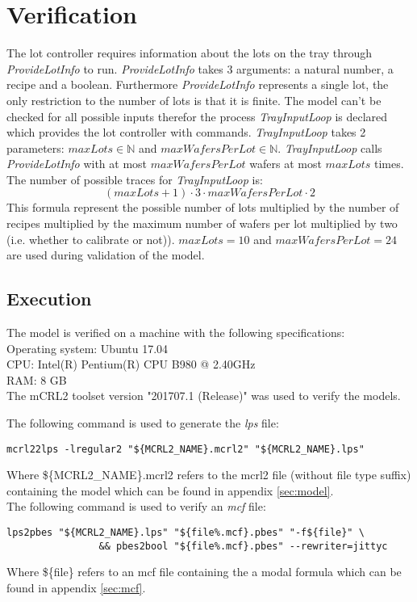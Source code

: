 \section{Verification}\label{sec:results}
The lot controller requires information about the lots on the tray through \textit{ProvideLotInfo} to run. \textit{ProvideLotInfo} takes 3 arguments: a natural number, a recipe and a boolean. Furthermore \textit{ProvideLotInfo} represents a single lot, the only restriction to the number of lots is that it is finite. The model can't be checked for all possible inputs therefor the process \textit{TrayInputLoop} is declared which provides the lot controller with  commands. \textit{TrayInputLoop} takes 2 parameters: $\mathit{maxLots} \in \mathbb{N}$ and $\mathit{maxWafersPerLot} \in \mathbb{N}$. \textit{TrayInputLoop} calls \textit{ProvideLotInfo} with at most $\mathit{maxWafersPerLot}$ wafers at most $\mathit{maxLots}$ times. The number of possible traces for \textit{TrayInputLoop} is:
$$(\mathit{maxLots}+1) \cdot 3 \cdot \mathit{maxWafersPerLot} \cdot 2$$
This formula represent the possible number of lots multiplied by the number of recipes multiplied by the maximum number of wafers per lot multiplied by two (i.e. whether to calibrate or not)). $\mathit{maxLots} = 10$ and $\mathit{maxWafersPerLot} = 24$ are used during validation of the model.

\subsection{Execution}
The model is verified on a machine with the following specifications:\\
Operating system: Ubuntu 17.04\\
CPU: Intel(R) Pentium(R) CPU B980 @ 2.40GHz\\
RAM: 8 GB\\

The mCRL2 toolset version "201707.1 (Release)" was used to verify the models.

The following command is used to generate the \textit{lps} file:\\
\begin{lstlisting}[style=sh,caption={mcf2lps}] 
mcrl22lps -lregular2 "${MCRL2_NAME}.mcrl2" "${MCRL2_NAME}.lps"
\end{lstlisting}
Where \$\{MCRL2\_NAME\}.mcrl2 refers to the mcrl2 file (without file type suffix) containing the model which can be found in appendix \ref{sec:model}.\\
The following command is used to verify an \textit{mcf} file:\\
\begin{lstlisting}[style=sh,caption={mcf check}] 
lps2pbes "${MCRL2_NAME}.lps" "${file%.mcf}.pbes" "-f${file}" \
                && pbes2bool "${file%.mcf}.pbes" --rewriter=jittyc
\end{lstlisting}
Where \$\{file\} refers to an mcf file containing the a modal formula which can be found in appendix \ref{sec:mcf}.\\
